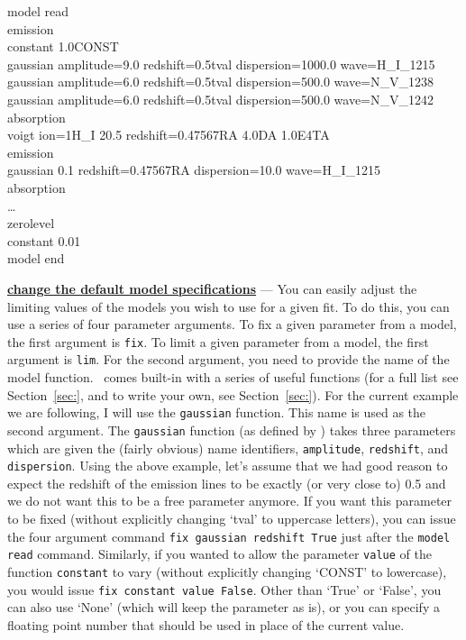 \vspace{0.3cm}
\begin{mdframed}[style=MyFrame]
model read\\
emission\\
constant 1.0CONST\\
gaussian amplitude=9.0 redshift=0.5tval dispersion=1000.0 wave=H\_I\_1215\\
gaussian amplitude=6.0 redshift=0.5tval dispersion=500.0 wave=N\_V\_1238\\
gaussian amplitude=6.0 redshift=0.5tval dispersion=500.0 wave=N\_V\_1242\\
absorption\\
voigt ion=1H\_I    20.5   redshift=0.47567RA    4.0DA   1.0E4TA\\
emission\\
gaussian 0.1 redshift=0.47567RA dispersion=10.0 wave=H\_I\_1215\\
absorption\\
\ldots\\
zerolevel\\
constant 0.01\\
model end
\end{mdframed}
\vspace{0.2cm}

\textbf{\underline{change the default model specifications}} --- You can easily
adjust the limiting values of the models you wish to use for a given fit. To do this,
you can use a series of four parameter arguments. To fix a given parameter from
a model, the first argument is \texttt{fix}. To limit a given parameter from a model,
the first argument is \texttt{lim}. For the second argument, you need to provide the
name of the model function. \alis\ comes built-in with a series of useful functions
(for a full list see Section~\ref{sec:}, and to write your own, see Section~\ref{sec:}).
For the current example we are following, I will use the \texttt{gaussian} function.
This name is used as the second argument. The \texttt{gaussian} function
(as defined by \alis) takes three parameters which are given the (fairly obvious)
name identifiers, \texttt{amplitude}, \texttt{redshift}, and \texttt{dispersion}.
Using the above example, let's assume that we had good reason to expect the
redshift of the emission lines to be exactly (or very close to) 0.5 and we do not
want this to be a free parameter anymore. If you want this parameter to be fixed
(without explicitly changing `tval' to uppercase letters), you can issue the four
argument command \texttt{fix gaussian redshift True} just after the
\texttt{model read} command. Similarly, if you wanted to allow the parameter
\texttt{value} of the function \texttt{constant} to vary (without explicitly changing
`CONST' to lowercase), you would issue \texttt{fix constant value False}.
Other than `True' or `False', you can also use `None' (which will keep the
parameter as is), or you can specify a floating point number that should be
used in place of the current value.

